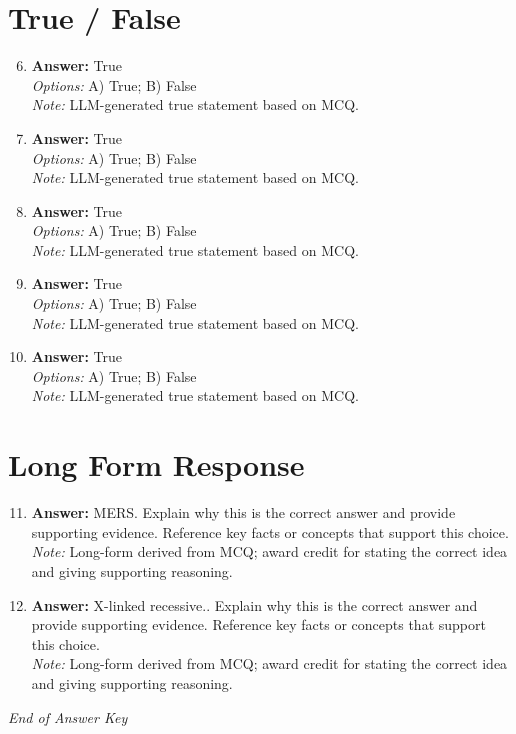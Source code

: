 \documentclass[12pt]{article}
\begin{document}
\section*{True / False}
\begin{enumerate}[label=\arabic*.]
\setcounter{enumi}{5}
\item \textbf{Answer:} True
\\ \textit{Options:} A) True; B) False
\\ \textit{Note:} LLM-generated true statement based on MCQ.
\item \textbf{Answer:} True
\\ \textit{Options:} A) True; B) False
\\ \textit{Note:} LLM-generated true statement based on MCQ.
\item \textbf{Answer:} True
\\ \textit{Options:} A) True; B) False
\\ \textit{Note:} LLM-generated true statement based on MCQ.
\item \textbf{Answer:} True
\\ \textit{Options:} A) True; B) False
\\ \textit{Note:} LLM-generated true statement based on MCQ.
\item \textbf{Answer:} True
\\ \textit{Options:} A) True; B) False
\\ \textit{Note:} LLM-generated true statement based on MCQ.
\end{enumerate}

\section*{Long Form Response}
\begin{enumerate}[label=\arabic*.]
\setcounter{enumi}{10}
\item \textbf{Answer:} MERS. Explain why this is the correct answer and provide supporting evidence. Reference key facts or concepts that support this choice.
\\ \textit{Note:} Long-form derived from MCQ; award credit for stating the correct idea and giving supporting reasoning.
\item \textbf{Answer:} X-linked recessive.. Explain why this is the correct answer and provide supporting evidence. Reference key facts or concepts that support this choice.
\\ \textit{Note:} Long-form derived from MCQ; award credit for stating the correct idea and giving supporting reasoning.
\end{enumerate}

\vfill
\noindent\textit{End of Answer Key}
\end{document}
